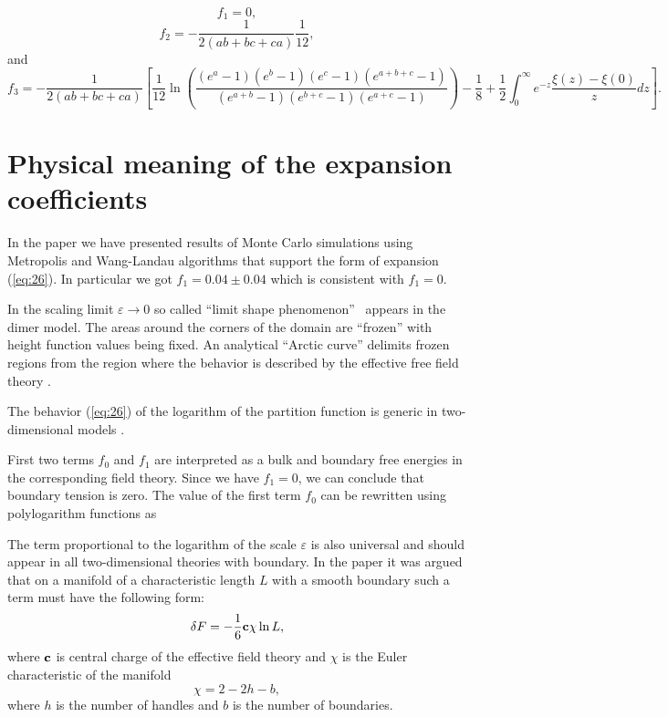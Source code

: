 \documentclass{article}
\begin{document}
\begin{equation}
  \label{eq:28}
  f_{1}=0,
\end{equation}
\begin{equation}
  \label{eq:30}
  f_{2}=-\frac{1}{2(ab+bc+ca)}\frac{1}{12},
\end{equation}
and
\begin{equation}
  \label{eq:29}
  f_{3}=-\frac{1}{2(ab+bc+ca)}\left[\frac{1}{12}\ln\left(\frac{(e^{a}-1)(e^{b}-1)(e^{c}-1)(e^{a+b+c}-1)}{(e^{a+b}-1)(e^{b+c}-1)(e^{a+c}-1)}\right)-\frac{1}{8}+ \frac{1}{2}\int_{0}^{\infty} e^{-z}\frac{\xi(z)-\xi(0)}{z} dz
    \right].
\end{equation}



\section{Physical meaning of the expansion coefficients}
\label{sec:accur-expans-phys}

In the paper \cite{1742-6596-1135-1-012024} we have presented results of Monte Carlo simulations using
Metropolis and Wang-Landau algorithms that support the form of expansion (\ref{eq:26}). In
particular we got $f_{1}=0.04\pm 0.04$ which is consistent with $f_{1}=0$. 

In the scaling limit $\varepsilon\to 0$ so called ``limit shape phenomenon''~\cite{1998math......1068J,cohn1998shape}
appears in the dimer model. The areas around the corners of the domain are ``frozen'' with height
function values being fixed. An analytical ``Arctic curve'' delimits frozen regions from the region
where the behavior is described by the effective free field theory
\cite{kenyon2009lectures,kenyon2008height,kenyon2006dimers}.

The behavior (\ref{eq:26}) of the logarithm of the partition function is generic in two-dimensional
models \cite{cardy1988finite}.

First two terms $f_{0}$ and $f_{1}$ are interpreted as a bulk and
boundary free energies in the corresponding field theory. Since we have $f_{1}=0$, we can conclude
that boundary tension is zero.
The value of the first term $f_{0}$ can be rewritten using polylogarithm functions as

The term proportional to the logarithm of the scale $\varepsilon$ is also universal
\cite{cardy1988finite} and should appear in all two-dimensional theories with boundary. In the paper
\cite{cardy1988finite} it was argued that on a manifold of a characteristic length $L$ with a smooth
boundary such a term must have the following form:
\begin{equation}
  \label{eq:31}
  \delta F = -\frac{1}{6}{\bf c} \chi \ln L,
\end{equation}
where ${\bf c}$ is central charge of the effective field theory and $\chi$ is the Euler characteristic of
the manifold
\begin{equation}
  \label{eq:32}
  \chi=2-2 h-b,
\end{equation}
where $h$ is the number of handles and $b$ is the number of boundaries. 
\end{document}
